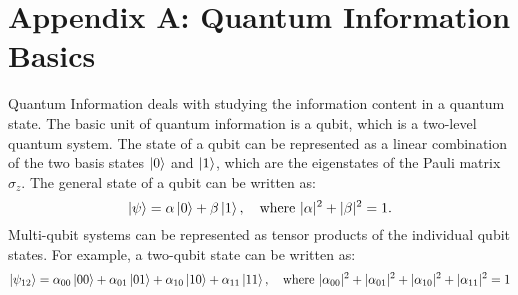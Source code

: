 \documentclass{scrartcl}
\begin{document}
\section*{Appendix A: {\huge Quantum Information Basics}}
Quantum Information deals with studying the information content in a quantum state. The basic unit of quantum information is a qubit, which is a two-level quantum system. The state of a qubit can be represented as a linear combination of the two basis states $\ket{0}$ and $\ket{1}$, which are the eigenstates of the Pauli matrix $\sigma_z$. The general state of a qubit can be written as:
\begin{equation*}
    \ket{\psi} = \alpha \ket{0} + \beta \ket{1}, \quad \text{where } |\alpha|^2 + |\beta|^2 = 1.
\end{equation*}
Multi-qubit systems can be represented as tensor products of the individual qubit states. For example, a two-qubit state can be written as:
\begin{equation*}
    \ket{\psi_{12}} = \alpha_{00} \ket{00} + \alpha_{01} \ket{01} + \alpha_{10} \ket{10} + \alpha_{11} \ket{11}, \quad \text{where } |\alpha_{00}|^2 + |\alpha_{01}|^2 + |\alpha_{10}|^2 + |\alpha_{11}|^2 = 1
\end{equation*} 
\end{document}
